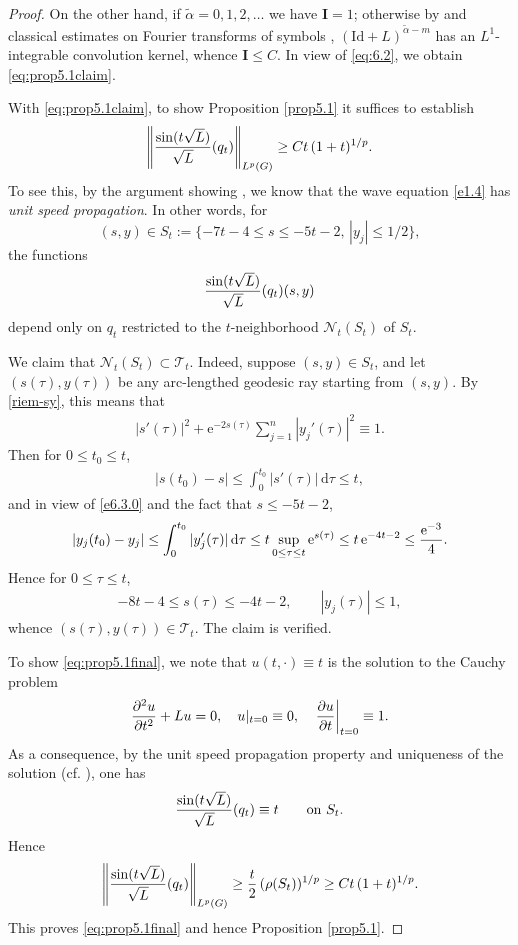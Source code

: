 \documentclass[a4paper,12pt]{amsart}
\numberwithin{equation}{section}
\theoremstyle{definition}
\theoremstyle{remark}
\numberwithin{theorem}{section}
\newcommand{\e}{\mathrm{e}}
\newcommand{\Id}{\mathrm{Id}}
\renewcommand{\d}{\mathrm{d}}
\begin{document}
\begin{proof}
On the other hand, if $\widetilde{\alpha}=0,1,2,\dots$ we have $\mathbf I=1$; otherwise by \cite[Propositions 4.1, 5.2 and 5.7]{MuTh} and classical estimates on Fourier transforms of symbols \cite[p. 241]{St}, $(\Id+L)^{\widetilde{\alpha}-m}$ has an $L^1$-integrable convolution kernel, whence $\mathbf I\leq C$. In view of \eqref{eq:6.2}, we obtain \eqref{eq:prop5.1claim}.
\smallskip

With \eqref{eq:prop5.1claim}, to show Proposition \ref{prop5.1} it suffices to establish
\begin{align}\label{eq:prop5.1final}
\left\|{\sin(t\sqrt{L})\over\sqrt{L}}(q_t)\right\|_{L^p(G)}\geq Ct\,(1+t)^{1/p}.
\end{align}
To see this, by the argument showing \cite[Theorem 2.4.2]{Sog14}, we know that the wave equation \eqref{e1.4} has \textit{unit speed propagation}. In other words, for
$$
(s,y)\in S_t:=\{-7t-4\leq s\leq -5t-2,\, |y_j|\leq 1/2\},
$$
the functions
$$
{\sin(t\sqrt{L})\over\sqrt{L}}(q_t)(s,y)
$$
depend only on $q_t$ restricted to the $t$-neighborhood $\mathcal N_t(S_t)$ of $S_t$.

We claim that $\mathcal N_t(S_t) \subset \mathcal T_t$. Indeed, suppose $(s,y)\in S_t$, and let $(s(\tau),y(\tau))$ be any arc-lengthed geodesic ray starting from $(s,y)$. By \eqref{riem-sy}, this means that
\begin{align*}
|s'(\tau)|^2+\e^{-2s(\tau)}\sum_{j=1}^n|y_j'(\tau)|^2\equiv 1.
\end{align*}
Then for $0\leq t_0\leq t$,
\begin{align}\label{e6.3.0}
|s(t_0)-s|\leq \int_0^{t_0}|s'(\tau)|\,\d\tau\leq t,
\end{align}
and in view of \eqref{e6.3.0} and the fact that $s\leq -5t-2$,
\begin{align*}
|y_j(t_0)-y_j|\leq \int_0^{t_0} |y_j'(\tau)|\,\d \tau\leq t\sup_{0\leq\tau\leq t}\e^{s(\tau)}\leq t\,\e^{-4t-2}\leq {\e^{-3}\over 4}.
\end{align*}
Hence for $0\leq \tau\leq t$,
\begin{align*}
-8t-4\leq s(\tau)\leq -4t-2,\qquad |y_j(\tau)|\leq 1,
\end{align*}
whence $(s(\tau),y(\tau))\in \mathcal{T}_t$. The claim is verified.

To show \eqref{eq:prop5.1final}, we note that $u(t,\cdot)\equiv t$ is the solution to the Cauchy problem
\begin{align*}
{\partial^2u\over\partial t^2}+Lu=0,\quad u|_{t=0}\equiv 0,\quad\left.{\partial u\over\partial t}\right|_{t=0}\equiv1.
\end{align*}
As a consequence, by the unit speed propagation property and uniqueness of the solution (cf. \cite[pp. 12--13]{Sog14}), one has
\begin{align*}
{\sin(t\sqrt{L})\over \sqrt{L}}(q_t)\equiv t \qquad\text{on }S_t.
\end{align*}
Hence
\begin{align*}
\left\|{\sin(t\sqrt{L})\over \sqrt{L}}(q_t)\right\|_{L^p(G)}\geq {t\over 2}\,(\rho(S_t))^{1/p}\geq Ct\,(1+t)^{1/p}.
\end{align*}
This proves \eqref{eq:prop5.1final} and hence Proposition \ref{prop5.1}.
\end{proof}
\medskip
\end{document}
